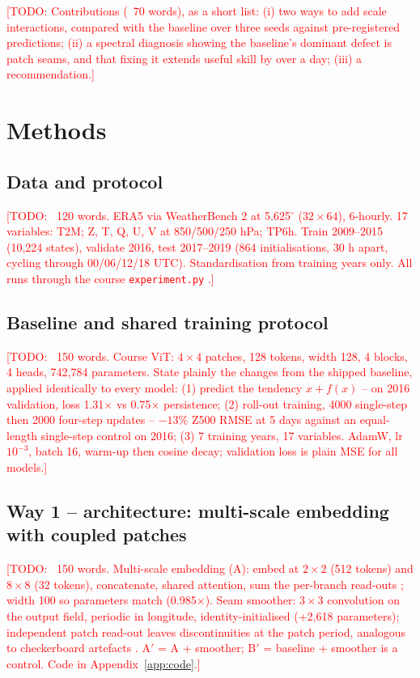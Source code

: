 \documentclass{article}
\newcommand{\todo}[1]{\textcolor{red}{[TODO: #1]}}
\begin{document}
\todo{Contributions (~70 words), as a short list: (i) two ways to add scale interactions, compared with the baseline over three seeds against pre-registered predictions; (ii) a spectral diagnosis showing the baseline's dominant defect is patch seams, and that fixing it extends useful skill by over a day; (iii) a recommendation.}

\section{Methods}
\label{sec:methods}

\subsection{Data and protocol}
\todo{~120 words. ERA5 \cite{hersbach2020era5} via WeatherBench 2 \cite{rasp2020weatherbench, rasp2024weatherbench2} at 5.625$^\circ$ ($32\times64$), 6-hourly. 17 variables: T2M; Z, T, Q, U, V at 850/500/250 hPa; TP6h. Train 2009--2015 (10,224 states), validate 2016, test 2017--2019 (864 initialisations, 30 h apart, cycling through 00/06/12/18 UTC). Standardisation from training years only. All runs through the course \texttt{experiment.py} \cite{thuemmel2026dlwplabs}.}

\subsection{Baseline and shared training protocol}
\todo{~150 words. Course ViT: $4\times4$ patches, 128 tokens, width 128, 4 blocks, 4 heads, 742,784 parameters. State plainly the changes from the shipped baseline, applied identically to every model: (1) predict the tendency $x + f(x)$ \cite{he2016resnet, lam2023graphcast} -- on 2016 validation, loss 1.31$\times$ vs 0.75$\times$ persistence; (2) roll-out training, 4000 single-step then 2000 four-step updates \cite{lam2023graphcast, keisler2022gnn} -- $-13\%$ Z500 RMSE at 5 days against an equal-length single-step control on 2016; (3) 7 training years, 17 variables. AdamW, lr $10^{-3}$, batch 16, warm-up then cosine decay; validation loss is plain MSE for all models.}

\subsection{Way 1 -- architecture: multi-scale embedding with coupled patches}
\todo{~150 words. Multi-scale embedding (A): embed at $2\times2$ (512 tokens) and $8\times8$ (32 tokens), concatenate, shared attention, sum the per-branch read-outs \cite{chen2021crossvit, fan2021mvit}; width 100 so parameters match (0.985$\times$). Seam smoother: $3\times3$ convolution on the output field, periodic in longitude, identity-initialised (+2,618 parameters); independent patch read-out leaves discontinuities at the patch period, analogous to checkerboard artefacts \cite{odena2016checkerboard}. A$'$ = A + smoother; B$'$ = baseline + smoother is a control. Code in Appendix~\ref{app:code}.}
\end{document}
